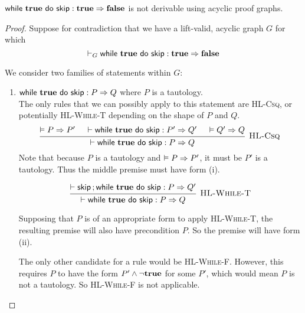 \begin{lemma}
    $\Triple {\While {\True} do {\Skip} } : \True => \False$ is not derivable using acyclic proof graphs.
\end{lemma}
\begin{proof}
Suppose for contradiction that we have a lift-valid, acyclic graph $G$ for which
$$\DERby G {\Triple {\While {\True} do {\Skip} } : \True => \False}$$

We consider two families of statements within $G$: %
\begin{enumerate}[label=(\roman*)]
\item $\Triple {\While {\True} do {\Skip} } : P => Q$ where $P$ is a tautology. \\
    The only rules that we can possibly apply to this statement are \textsc{HL-Csq},
    or potentially \textsc{HL-While-T} depending on the shape of $P$ and $Q$.
    \[\begin{prooftree}
        \hypo{\VAL P \Rightarrow P'}
        \hypo{\DER \Triple {\While {\True} do {\Skip} } : P' => Q'}
        \hypo{\VAL Q' \Rightarrow Q}
        \infer3[\textsc{HL-Csq}] 
            {\DER \Triple {\While {\True} do {\Skip} } : P => Q}
    \end{prooftree}\]
%
    Note that because $P$ is a tautology and $\vDash P \Rightarrow P'$,
    it must be $P'$ is a tautology.
    Thus the middle premise must have form (i).
    
    \[\begin{prooftree}
        \hypo{\DER \Triple {\Seq {\Skip} ; {\While {\True} do {\Skip}} } : P => Q'}
        \infer1[\textsc{HL-While-T}] 
            {\DER \Triple {\While {\True} do {\Skip} } : P => Q }
    \end{prooftree}\]

    Supposing that $P$ is of an appropriate form to apply \textsc{HL-While-T},
    the resulting premise will also have precondition $P$.
    So the premise will have form (ii).
    
    The only other candidate for a rule would be \textsc{HL-While-F}.
    However, this requires $P$ to have the form $P' \wedge \neg \textbf{true}$ for some $P'$,
    which would mean $P$ is not a tautology. %
    So \textsc{HL-While-F} is not applicable.


\end{enumerate}
\end{proof}
